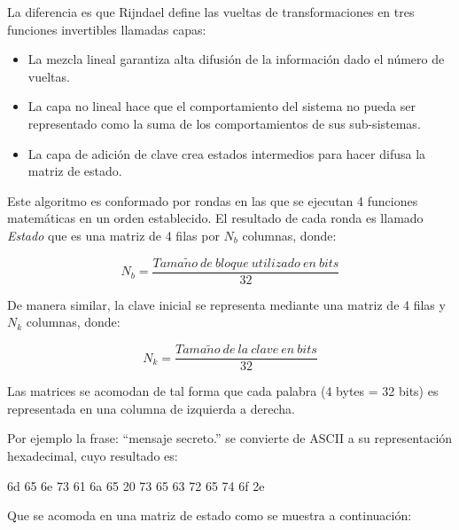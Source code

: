\documentclass[../main/main.tex]{subfiles}
\begin{document}
    La diferencia es que Rijndael define las vueltas de transformaciones en tres funciones invertibles llamadas capas:

    \begin{itemize}[noitemsep,nolistsep]
      \item La mezcla lineal garantiza alta difusión de la información dado el número de vueltas.
      \item La capa no lineal hace que el comportamiento del sistema no pueda ser representado como la suma de los comportamientos de sus sub-sistemas.
      \item La capa de adición de clave crea estados intermedios para hacer difusa la matriz de estado.
    \end{itemize}

    Este algoritmo es conformado por rondas en las que se ejecutan 4 funciones matemáticas en un orden establecido. El resultado de cada ronda es llamado \textit{Estado} que es una matriz de 4 filas por $N_b$ columnas, donde:

    \vspace{-0.7cm}\begin{equation}
      N_b = \frac{Tama\tilde{n}o\ de\ bloque\ utilizado\ en\ bits}{32}
    \end{equation}

    De manera similar, la clave inicial se representa mediante una matriz de 4 filas y $N_k$ columnas, donde:

    \vspace{-0.7cm}\begin{equation}
      N_k = \frac{Tama\tilde{n}o\ de\ la\ clave\ en\ bits}{32}
    \end{equation}
    
    Las matrices se acomodan de tal forma que cada palabra (4 bytes = 32 bits) es representada en una columna de izquierda a derecha.

    Por ejemplo la frase: ``mensaje secreto.'' se convierte de ASCII a su representación hexadecimal, cuyo resultado es:

    \begin{center}
      6d 65 6e 73 61 6a 65 20 73 65 63 72 65 74 6f 2e
    \end{center}

    Que se acomoda en una matriz de estado como se muestra a continuación:

    \begin{table}[H]
      \centering
      
    \end{table}
\end{document}
